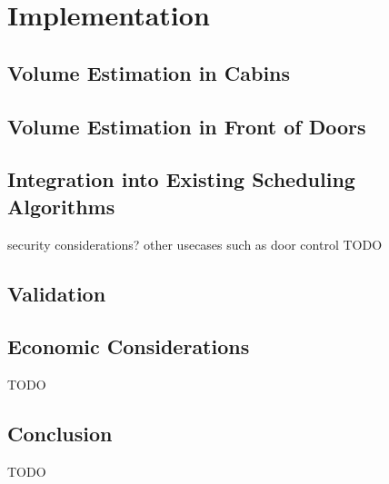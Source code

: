 \chapter{Implementation}
\label{chap:impl}

\section{Volume Estimation in Cabins}

\section{Volume Estimation in Front of Doors}

\section{Integration into Existing Scheduling Algorithms}

security considerations?
other usecases such as door control
TODO

\section{Validation}

\section{Economic Considerations}

TODO

\section{Conclusion}

TODO